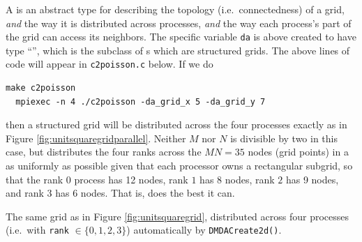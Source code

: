 A \pDM is an abstract type for describing the topology (i.e.~connectedness) of a grid, \emph{and} the way it is distributed across \MPI processes, \emph{and} the way each process's part of the grid can access its neighbors.  The specific variable \texttt{da} is above created to have type ``\pDMDA'', which is the subclass of \pDM s which are structured grids.  The above lines of code will appear in \texttt{c2poisson.c} below.  If we do
\begin{Verbatim}[fontsize=\small]
  make c2poisson
  mpiexec -n 4 ./c2poisson -da_grid_x 5 -da_grid_y 7
\end{Verbatim}
then a structured grid will be distributed across the four processes exactly as in Figure \ref{fig:unitsquaregridparallel}.  Neither $M$ nor $N$ is divisible by two in this case, but \PETSc distributes the four ranks across the $MN=35$ nodes (grid points) in a as uniformly as possible given that each processor owns a rectangular subgrid, so that the rank $0$ process has 12 nodes, rank $1$ has 8 nodes, rank $2$ has 9 nodes, and rank  $3$ has 6 nodes.  That is, \PETSc does the best it can.

\begin{marginfigure}
\caption{The same grid as in Figure \ref{fig:unitsquaregrid}, distributed across four \MPI processes (i.e.~with \texttt{rank} $\in \{0,1,2,3\}$) automatically by \texttt{DMDACreate2d()}.}
\label{fig:unitsquaregridparallel}
\end{marginfigure}

